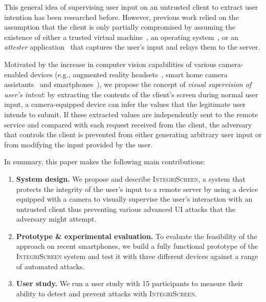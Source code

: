 \documentclass[sigconf, anonymous, balance=false]{acmart}
\newcommand{\is}[1]{\textcolor{blue}{Ivo: #1}}
\newcommand{\updatelater}[1]{#1\xspace}
\newcommand{\sysname}{\textsc{IntegriScreen}\xspace}
\begin{document}
This general idea of supervising user input on an untrusted client to extract user intention has been researched before. However, previous work relied on the assumption that the client is only partially compromised by assuming the existence of either a trusted virtual machine~\cite{gyrus}, an operating system~\cite{binder}, or an \emph{attester} application~\cite{nab} that captures the user's input and relays them to the server.

Motivated by the increase in computer vision capabilities of various camera-enabled devices (e.g., augmented reality headsets~\cite{TimCookAR, HoloLens2}, smart home camera assistants~\cite{fleck2008smart, lenovoSmartHome} and smartphones~\cite{wald2018real, smartphonesCV}), we propose the concept of \emph{visual supervision of user's intent}: by extracting the contents of the client's screen during normal user input, a camera-equipped device can infer the values that the legitimate user intends to submit.
If these extracted values are independently sent to the remote service and compared with each request received from the client, the adversary that controls the client is prevented from either generating arbitrary user input or from modifying the input provided by the user.

In summary, this paper makes the following main contributions:
\begin{enumerate}%
	\item \textbf{System design.}
	We propose and describe \sysname, a system that protects the integrity of the user's input to a remote server by using a device equipped with a camera to visually supervise the user's interaction with an untrusted client thus preventing various advanced UI attacks that the adversary might attempt.


	\item \textbf{Prototype \& experimental evaluation.}
	To evaluate the feasibility of the approach on recent smartphones, we build a fully functional prototype of the \sysname system and test it with \updatelater{three} different devices against a range of automated attacks.

	\item \textbf{User study.}
	We run a user study with \updatelater{15} participants to measure their ability to detect and prevent attacks with \sysname.

\end{enumerate}
\end{document}
